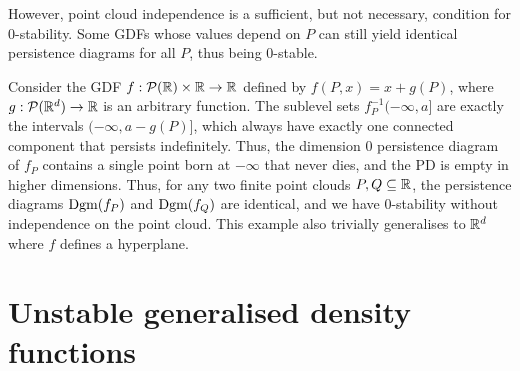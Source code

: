 However, point cloud independence is a sufficient, but not necessary, condition
for 0-stability. Some GDFs whose values depend on $P$ can still yield identical
persistence diagrams for all $P$, thus being $0$-stable.
\begin{example}
    \label{ex:x_plus_g}
    Consider the GDF $f : \mathcal{P}(\mathbb{R}) \times \mathbb{R} \to \mathbb{R}$ defined by
    $f(P, x) = x + g(P)$, where $g : \mathcal{P}(\mathbb{R}^d) \to \mathbb{R}$ is an arbitrary
    function.
    The sublevel sets $f_P^{-1}(-\infty, a]$ are exactly the intervals
    $(-\infty, a - g(P)]$, which always have exactly one connected component
    that persists indefinitely. Thus, the dimension $0$ persistence diagram of
    $f_P$ contains a single point born at $-\infty$ that never dies, and the PD
    is empty in higher dimensions. Thus, for any two finite point clouds $P, Q
    \subseteq \mathbb{R}$, the persistence diagrams $\operatorname{Dgm}(f_P)$ and $\operatorname{Dgm}(f_Q)$ are
    identical, and we have $0$-stability without independence on the point
    cloud. This example also trivially generalises to $\mathbb{R}^d$ where $f$ defines a
    hyperplane.
\end{example}

\section{Unstable generalised density functions}

